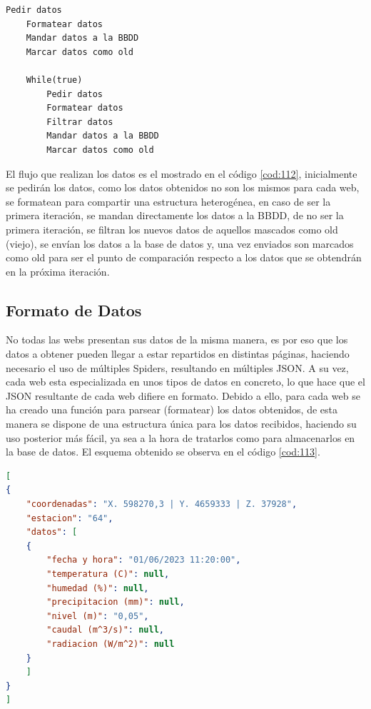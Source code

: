 \begin{lstlisting}[caption={Flujo de obtencion y tratamiento de los datos}, label=cod:112]
	Pedir datos
	Formatear datos
	Mandar datos a la BBDD
	Marcar datos como old
	
	While(true)
		Pedir datos
		Formatear datos
		Filtrar datos
		Mandar datos a la BBDD
		Marcar datos como old
\end{lstlisting}

El flujo que realizan los datos es el mostrado en el código \ref{cod:112}, inicialmente se pedirán los datos, como los datos obtenidos no son los mismos para cada web, se formatean para compartir una estructura heterogénea, en caso de ser la primera iteración, se mandan directamente los datos a la BBDD, de no ser la primera iteración, se filtran los nuevos datos de aquellos mascados como old (viejo), se envían los datos a la base de datos y, una vez enviados son marcados como old para ser el punto de comparación respecto a los datos que se obtendrán en la próxima iteración.

\subsection{Formato de Datos}
No todas las webs presentan sus datos de la misma manera, es por eso que los datos a obtener pueden llegar a estar repartidos en distintas páginas, haciendo necesario el uso de múltiples Spiders, resultando en múltiples JSON. A su vez, cada web esta especializada en unos tipos de datos en concreto, lo que hace que el JSON resultante de cada web difiere en formato.\newline
\newline
Debido a ello, para cada web se ha creado una función para parsear (formatear) los datos obtenidos, de esta manera se dispone de una estructura única para los datos recibidos, haciendo su uso posterior más fácil, ya sea a la hora de tratarlos como para almacenarlos en la base de datos. El esquema obtenido se observa en el código \ref{cod:113}.

\begin{lstlisting}[language=json, basicstyle=\small, label=cod:113]
[
{
	"coordenadas": "X. 598270,3 | Y. 4659333 | Z. 37928",
	"estacion": "64",
	"datos": [
	{
		"fecha y hora": "01/06/2023 11:20:00",
		"temperatura (C)": null,
		"humedad (%)": null,
		"precipitacion (mm)": null,
		"nivel (m)": "0,05",
		"caudal (m^3/s)": null,
		"radiacion (W/m^2)": null
	}
	]
}
]
\end{lstlisting}

